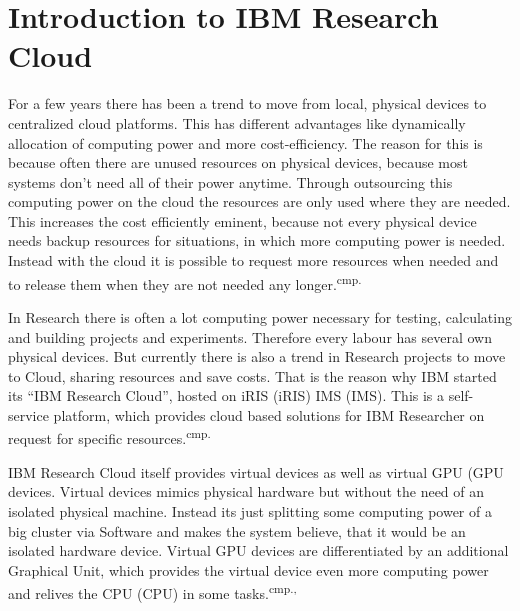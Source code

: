
\section{Introduction to IBM Research Cloud}

For a few years there has been a trend to move from local, physical devices to centralized cloud platforms. This has different advantages like dynamically allocation of computing power and more cost-efficiency. The reason for this is because often there are unused resources on physical devices, because most systems don't need all of their power anytime. Through outsourcing this computing power on the cloud the resources are only used where they are needed. This increases the cost efficiently eminent, because not every physical device needs backup resources for situations, in which more computing power is needed. Instead with the cloud it is possible to request more resources when needed and to release them when they are not needed any longer.\textsuperscript{cmp.\cite{8}}


In Research there is often a lot computing power necessary for testing, calculating and building projects and experiments. Therefore every labour has several own physical devices. But currently there is also a trend in Research projects to move to Cloud, sharing resources and save costs. That is the reason why IBM started its ``IBM Research Cloud'', hosted on \acs{iRIS} (\acl{iRIS}) \acs{IMS} (\acl{IMS}). This is a self-service platform, which provides cloud based solutions for IBM Researcher on request for specific resources.\textsuperscript{cmp.\cite{9}}


IBM Research Cloud itself provides virtual devices as well as virtual \acs{GPU} (\acl{GPU} devices. Virtual devices mimics physical hardware but without the need of an isolated physical machine. Instead its just splitting some computing power of a big cluster via Software and makes the system believe, that it would be an isolated hardware device. Virtual GPU devices are differentiated by an additional Graphical Unit, which provides the virtual device even more computing power and relives the \acs{CPU} (\acl{CPU}) in some tasks.\textsuperscript{cmp.\cite{10}, \cite{11}}

